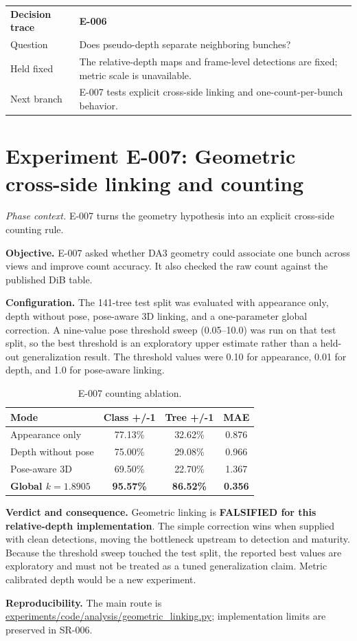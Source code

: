 \documentclass[preprint,12pt]{elsarticle}
\newcommand{\pathcode}[1]{\scriptsize\url{#1}}
\newcommand{\experiment}[2]{\par\medskip\Needspace{7\baselineskip}\section{Experiment #1: #2}}
\newcommand{\decisioncard}[4]{%
\begin{table}[H]\centering\small
\begin{tabularx}{\columnwidth}{L{0.22\columnwidth}Y}
\toprule
\textbf{Decision trace} & \textbf{#1}\\
Question & #2\\
Held fixed & #3\\
Next branch & #4\\
\bottomrule
\end{tabularx}
\end{table}}
\newcommand{\phasecontext}[1]{%
\par\smallskip\noindent\textit{Phase context.} #1\par\smallskip}
\begin{document}
\decisioncard{E-006}{Does pseudo-depth separate neighboring bunches?}{The relative-depth maps and frame-level detections are fixed; metric scale is unavailable.}{E-007 tests explicit cross-side linking and one-count-per-bunch behavior.}
\experiment{E-007}{Geometric cross-side linking and counting}
\phasecontext{E-007 turns the geometry hypothesis into an explicit cross-side counting rule.}
\textbf{Objective.} E-007 asked whether DA3 geometry could associate one bunch
across views and improve count accuracy. It also checked the raw count against
the published DiB table.

\textbf{Configuration.} The 141-tree test split was evaluated with appearance
only, depth without pose, pose-aware 3D linking, and a one-parameter global
correction. A nine-value pose threshold sweep (0.05--10.0) was run on that
test split, so the best threshold is an exploratory upper estimate rather than
a held-out generalization result. The threshold values were 0.10 for
appearance, 0.01 for depth, and 1.0 for pose-aware linking.

\begin{table}[H]
\centering
\caption{E-007 counting ablation.}
\begin{tabular}{L{0.50\columnwidth}ccc}
\toprule
\textbf{Mode} & \textbf{Class +/-1} & \textbf{Tree +/-1} & \textbf{MAE}\\
\midrule
Appearance only & 77.13\% & 32.62\% & 0.876\\
Depth without pose & 75.00\% & 29.08\% & 0.966\\
Pose-aware 3D & 69.50\% & 22.70\% & 1.367\\
\textbf{Global \(k=1.8905\)} & \textbf{95.57\%} & \textbf{86.52\%} & \textbf{0.356}\\
\bottomrule
\end{tabular}
\end{table}

\textbf{Verdict and consequence.} Geometric linking is \textbf{FALSIFIED for
this relative-depth implementation}. The simple correction wins when supplied
with clean detections, moving the bottleneck upstream to detection and
maturity. Because the threshold sweep touched the test split, the reported
best values are exploratory and must not be treated as a tuned generalization
claim. Metric calibrated depth would be a new experiment.

\textbf{Reproducibility.} The main route is
\pathcode{experiments/code/analysis/geometric_linking.py}; implementation
limits are preserved in SR-006.
\end{document}
